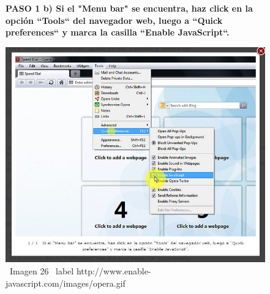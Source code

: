 \documentclass[11pt]{article} %
\begin{document}
\begin{figure}
\begin{center}

\begin{center}
\bf PASO 1
 b) Si el "Menu bar" se encuentra, haz click en la opción ``Tools`` del navegador web, luego a ``Quick preferences`` y marca la casilla ``Enable JavaScript``.
\end{center}

\includegraphics[height=8 cm, width=8 cm] {imagenes/opera 02.jpg}
\newline
\newline
\ Imagen 26
\ label {http://www.enable-javascript.com/images/opera.gif}

\end{center}
\end{figure}

\lstset{language=Pascal}          %
\end{document}
